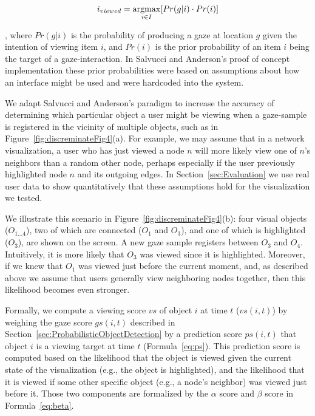 \begin{equation*}
i_{viewed} = \displaystyle \operatorname*{argmax}_{i\in I}[Pr(g|i)\cdot Pr(i)]
\end{equation*}

, where $Pr(g|i)$ is the probability of producing a gaze at location $g$ given the intention of viewing item $i$, and $Pr(i)$ is the prior probability of an item $i$  being the target of a gaze-interaction. In Salvucci and Anderson's proof of concept implementation these prior probabilities were based on assumptions about how an interface might be used and were hardcoded into the system.  


We adapt Salvucci and Anderson's paradigm to increase the accuracy of determining which particular object a user might be viewing when a gaze-sample is registered in the vicinity of multiple objects, such as in Figure~\ref{fig:discreminateFig4}(a). For example, we may assume that in a network visualization, a user who has just viewed a node $n$ will more likely view one of $n$'s neighbors than a random other node, perhaps especially if the user previously highlighted node $n$ and its outgoing edges.  In Section~\ref{sec:Evaluation} we use real user data to show quantitatively  that these assumptions hold for the visualization we tested. 

We illustrate this scenario in Figure~\ref{fig:discreminateFig4}(b): four visual objects ($O_{1\ldots 4}$), two of which are connected ($O_1$ and $O_3$), and one of which is highlighted ($O_3$), are shown on the screen. A new gaze sample registers between $O_3$ and $O_4$. Intuitively, it is more likely that $O_3$ was viewed since it is highlighted. Moreover, if we knew that $O_1$ was viewed just before the current moment, and, as described above we assume that users generally view neighboring nodes together, then this likelihood becomes even stronger.  
 
Formally, we compute a viewing score $vs$ of object $i$ at time $t$ ($vs(i,t)$) by weighing the gaze score $gs(i,t)$ described in Section~\ref{sec:ProbabilisticObjectDetection} by a prediction score $ps(i,t)$ that object $i$ is a viewing target at time $t$ (Formula~\ref{eq:ps}). This prediction score is computed based on the likelihood that the object is viewed given the current state of the visualization (e.g., the object is highlighted), and the likelihood that it is viewed if some other specific object (e.g.,  a node's neighbor) was viewed just before it. Those two components are formalized by the  $\alpha$ score and $\beta$ score in Formula~\ref{eq:beta}.

